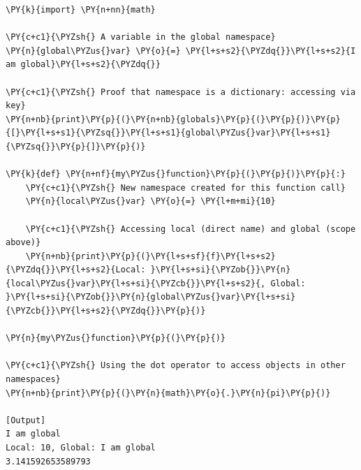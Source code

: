\begin{Verbatim}[label=\makebox{\url{namespaces_example.py}},commandchars=\\\{\}]
\PY{k}{import} \PY{n+nn}{math}

\PY{c+c1}{\PYZsh{} A variable in the global namespace}
\PY{n}{global\PYZus{}var} \PY{o}{=} \PY{l+s+s2}{\PYZdq{}}\PY{l+s+s2}{I am global}\PY{l+s+s2}{\PYZdq{}}

\PY{c+c1}{\PYZsh{} Proof that namespace is a dictionary: accessing via key}
\PY{n+nb}{print}\PY{p}{(}\PY{n+nb}{globals}\PY{p}{(}\PY{p}{)}\PY{p}{[}\PY{l+s+s1}{\PYZsq{}}\PY{l+s+s1}{global\PYZus{}var}\PY{l+s+s1}{\PYZsq{}}\PY{p}{]}\PY{p}{)}

\PY{k}{def} \PY{n+nf}{my\PYZus{}function}\PY{p}{(}\PY{p}{)}\PY{p}{:}
    \PY{c+c1}{\PYZsh{} New namespace created for this function call}
    \PY{n}{local\PYZus{}var} \PY{o}{=} \PY{l+m+mi}{10}
    
    \PY{c+c1}{\PYZsh{} Accessing local (direct name) and global (scope above)}
    \PY{n+nb}{print}\PY{p}{(}\PY{l+s+sf}{f}\PY{l+s+s2}{\PYZdq{}}\PY{l+s+s2}{Local: }\PY{l+s+si}{\PYZob{}}\PY{n}{local\PYZus{}var}\PY{l+s+si}{\PYZcb{}}\PY{l+s+s2}{, Global: }\PY{l+s+si}{\PYZob{}}\PY{n}{global\PYZus{}var}\PY{l+s+si}{\PYZcb{}}\PY{l+s+s2}{\PYZdq{}}\PY{p}{)}

\PY{n}{my\PYZus{}function}\PY{p}{(}\PY{p}{)}

\PY{c+c1}{\PYZsh{} Using the dot operator to access objects in other namespaces}
\PY{n+nb}{print}\PY{p}{(}\PY{n}{math}\PY{o}{.}\PY{n}{pi}\PY{p}{)}

[Output]
I am global
Local: 10, Global: I am global
3.141592653589793
\end{Verbatim}